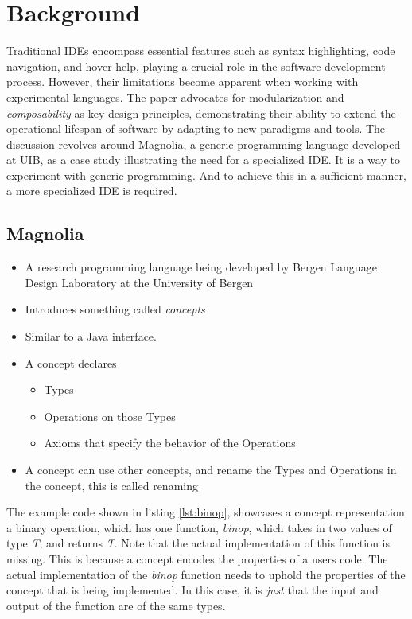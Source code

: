 \chapter{Background}

Traditional IDEs encompass essential features such as syntax highlighting, code
navigation, and hover-help, playing a crucial role in the software development
process. However, their limitations become apparent when working with
experimental languages. The paper advocates for modularization and \textit{composability}
as key design principles, demonstrating their ability to extend the operational
lifespan of software by adapting to new paradigms and tools. The discussion
revolves around Magnolia, a generic programming language developed at UIB, as a
case study illustrating the need for a specialized IDE. It is a way to experiment
with generic programming. And to achieve this in a sufficient manner, a more
specialized IDE is required.

\section{Magnolia}

\begin{itemize}
  \item A research programming language being developed by
    Bergen Language Design Laboratory at the University of Bergen
  \item Introduces something called \textit{concepts}
  \item Similar to a Java interface.
  \item A concept declares
    \begin{itemize}
      \item Types
      \item Operations on those Types
      \item Axioms that specify the behavior of the Operations
    \end{itemize}
  \item A concept can use other concepts, and rename the Types and Operations
    in the concept, this is called renaming
\end{itemize}

The example code shown in listing \ref{lst:binop}, showcases a concept
representation a binary operation, which has one function, \textit{binop}, which
takes in two values of type \textit{T}, and returns \textit{T}. Note that the
actual implementation of this function is missing. This is because a concept
encodes the properties of a users code. The actual implementation of the
\textit{binop} function needs to uphold the properties of the concept that is
being implemented. In this case, it is \textit{just} that the input and output
of the function are of the same types.

